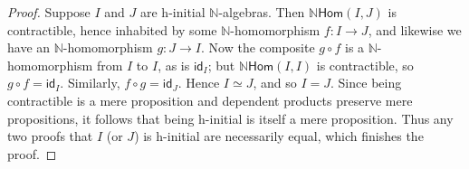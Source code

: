 \documentclass[10pt,a4paper]{article}
\newcommand{\idfunc}[1][]{\ensuremath{\mathsf{id}_{#1}}\xspace}
\newcommand{\eqv}[2]{\ensuremath{#1 \simeq #2}\xspace}
\newcommand{\N}{\ensuremath{\mathbb{N}}\xspace}
\let\nat\N
\newcommand{\nhom}{\nat\mathsf{Hom}}
\theoremstyle{definition}
\theoremstyle{remark}
\numberwithin{equation}{section}
\begin{document}
\begin{proof}
  Suppose $I$ and $J$ are h-initial $\nat$-algebras.
  Then $\nhom(I,J)$ is contractible, hence inhabited by some $\nat$-homomorphism $f:I\to J$, and likewise we have an $\nat$-homomorphism $g:J\to I$.
  Now the composite $g\circ f$ is a $\nat$-homomorphism from $I$ to $I$, as is $\idfunc[I]$; but $\nhom(I,I)$ is contractible, so $g\circ f = \idfunc[I]$.
  Similarly, $f\circ g = \idfunc[J]$.
  Hence $\eqv IJ$, and so $I=J$. Since being contractible is a mere proposition and dependent products preserve mere propositions, it follows that being h-initial is itself a mere proposition. Thus any two proofs that $I$ (or $J$) is h-initial are necessarily equal, which finishes the proof.
\end{proof}
\end{document}
